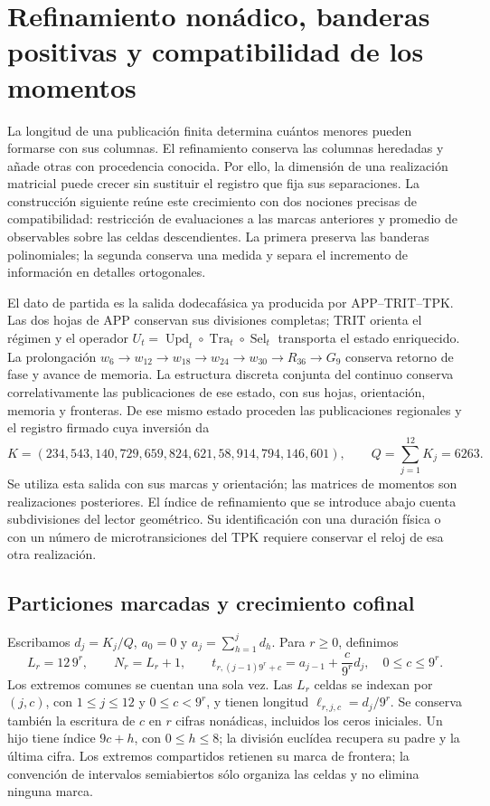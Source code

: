 \section{Refinamiento nonádico, banderas positivas y compatibilidad de los momentos}
\label{sec:dim-cofinal}

La longitud de una publicación finita determina cuántos menores pueden
formarse con sus columnas. El refinamiento conserva las columnas heredadas
y añade otras con procedencia conocida. Por ello, la dimensión de una
realización matricial puede crecer sin sustituir el registro que fija sus
separaciones. La construcción siguiente reúne este crecimiento con dos
nociones precisas de compatibilidad: restricción de evaluaciones a las
marcas anteriores y promedio de observables sobre las celdas descendientes.
La primera preserva las banderas polinomiales; la segunda conserva una
medida y separa el incremento de información en detalles ortogonales.

El dato de partida es la salida dodecafásica ya producida por
APP--TRIT--TPK. Las dos hojas de APP conservan sus divisiones completas;
TRIT orienta el régimen y el operador
\(U_t=\operatorname{Upd}_t\circ\operatorname{Tra}_t\circ
\operatorname{Sel}_t\) transporta el estado enriquecido. La prolongación
\(w_6\to w_{12}\to w_{18}\to w_{24}\to w_{30}\to R_{36}\to G_9\)
conserva retorno de fase y avance de memoria. La estructura discreta conjunta
del continuo conserva correlativamente las publicaciones de ese estado,
con sus hojas, orientación, memoria y fronteras. De ese mismo estado proceden
las publicaciones regionales y el registro firmado cuya inversión da
\[
 K=(234,543,140,729,659,824,621,58,914,794,146,601),
 \qquad Q=\sum_{j=1}^{12}K_j=6263.
\]
Se utiliza esta salida con sus marcas y orientación; las matrices de
momentos son realizaciones posteriores. El índice de refinamiento que se
introduce abajo cuenta subdivisiones del lector geométrico. Su identificación
con una duración física o con un número de microtransiciones del TPK
requiere conservar el reloj de esa otra realización.

\subsection{Particiones marcadas y crecimiento cofinal}

Escribamos \(d_j=K_j/Q\), \(a_0=0\) y
\(a_j=\sum_{h=1}^j d_h\). Para \(r\geq0\), definimos
\[
 L_r=12\,9^r,\qquad N_r=L_r+1,\qquad
 t_{r,(j-1)9^r+c}=a_{j-1}+\frac{c}{9^r}d_j,
 \quad 0\leq c\leq9^r.
\]
Los extremos comunes se cuentan una sola vez. Las \(L_r\) celdas se
indexan por \((j,c)\), con \(1\leq j\leq12\) y
\(0\leq c<9^r\), y tienen longitud
\(\ell_{r,j,c}=d_j/9^r\). Se conserva también la escritura de \(c\)
en \(r\) cifras nonádicas, incluidos los ceros iniciales. Un hijo tiene
índice \(9c+h\), con \(0\leq h\leq8\); la división euclídea recupera
su padre y la última cifra. Los extremos compartidos retienen su marca
de frontera; la convención de intervalos semiabiertos sólo organiza
las celdas y no elimina ninguna marca.

